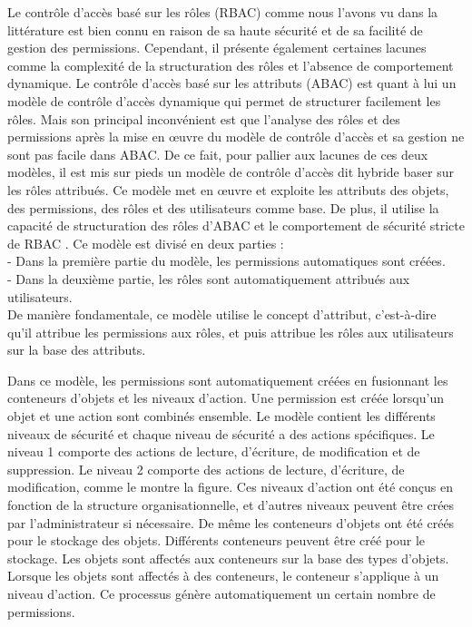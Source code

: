 \label{sectionAR-BAC}

Le contrôle d'accès basé sur les rôles (RBAC) comme nous l'avons vu dans la littérature est bien connu en raison de sa haute sécurité et de sa facilité de gestion des permissions. Cependant, il présente également certaines lacunes comme la complexité de la structuration des rôles et l'absence de comportement dynamique. Le contrôle d'accès basé sur les attributs (ABAC) est quant à lui un modèle de contrôle d'accès dynamique qui permet de structurer facilement les rôles. Mais son principal inconvénient est que l'analyse des rôles et des permissions après la mise en œuvre du modèle de contrôle d'accès et sa gestion ne sont pas facile dans ABAC. De ce fait, pour pallier aux lacunes de ces deux modèles, il est mis sur pieds un modèle de contrôle d'accès dit hybride baser sur les rôles attribués. Ce modèle met en œuvre et exploite les attributs des objets, des permissions, des rôles et des utilisateurs comme base. De plus, il utilise la capacité de structuration des rôles d'ABAC et le comportement de sécurité stricte de RBAC . Ce modèle est divisé en deux parties :\\
- Dans la première partie du modèle, les permissions automatiques sont créées.\\
- Dans la deuxième partie, les rôles sont automatiquement attribués aux utilisateurs.\\
De manière fondamentale, ce modèle utilise le concept d'attribut, c'est-à-dire qu'il attribue les permissions aux rôles, et puis attribue les rôles aux utilisateurs sur la base des attributs.

\label{sectionCreationPermissionAR-BAC}

Dans ce modèle, les permissions sont automatiquement créées en fusionnant les conteneurs d'objets et les niveaux d'action. Une permission est créée lorsqu'un objet et une action sont combinés ensemble. Le modèle contient les différents niveaux de sécurité et chaque niveau de sécurité a des actions spécifiques. Le niveau 1 comporte des actions de lecture, d'écriture, de modification et de suppression. Le niveau 2 comporte des actions de lecture, d'écriture, de modification, comme le montre la figure. Ces niveaux d'action ont été conçus en fonction de la structure organisationnelle, et d'autres niveaux peuvent être crées par l'administrateur si nécessaire. De même les conteneurs d'objets ont été créés pour le stockage des objets. Différents conteneurs peuvent être créé pour le stockage. Les objets sont affectés aux conteneurs sur la base des types d'objets. Lorsque les objets sont affectés à des conteneurs, le conteneur s'applique à un niveau d'action. Ce processus génère automatiquement un certain nombre de permissions.

